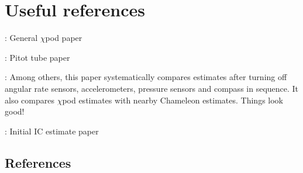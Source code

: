 \chapter{Useful references}
\cite{Moum2009a} : General $\chi$pod paper

\cite{Moum2015} : Pitot tube paper

\cite{Perlin2012} : Among others, this paper systematically compares estimates after turning off angular rate sensors, accelerometers, pressure sensors and compass in sequence. It also compares $\chi$pod estimates with nearby Chameleon estimates. Things look good!

\cite{Zhang2010a} : Initial IC estimate paper

\section*{References}

\renewcommand{\bibsection}{}


